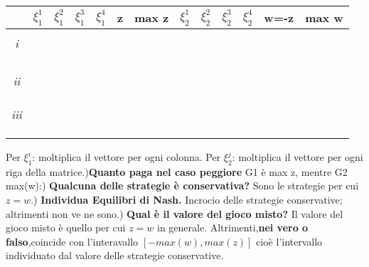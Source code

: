 \documentclass{article}
\theoremstyle{definition}
\theoremstyle{remark}
\begin{document}
\begin{center}
    \begin{tabular}{|c|c |c |c |c |c |c |c |c |c |c |c | c|}
     \hline
     &\(\xi _1^1\) & \(\xi_1^2\) & \(\xi_1^3\) & \(\xi_1^4\) & z & max z & \(\xi_2^1\) & \(\xi_2^2\) & \(\xi_2^3\) & \(\xi_2^4\) & w=-z & max w\\ [0.5ex] 
     \hline
      & & & & & & & & & & & &\\
      \hline
      \emph{i}& & & & & & & & & & & &\\
      \hline
       & & & & & & & & & & & &\\
      \hline
      & & & & & & & & & & & &\\
      \hline\hline
      & & & & & & & & & & & &\\
      \hline
      & & & & & & & & & & & &\\
       \hline
       \emph{ii}& & & & & & & & & & & &\\
       & & & & & & & & & & & &\\
      \hline
      & & & & & & & & & & & &\\
       \hline\hline
      & & & & & & & & & & & &\\
       \hline
       \emph{iii} & & & & & & & & & & & &\\
       & & & & & & & & & & & &\\
      \hline
      & & & & & & & & & & & &\\
       \hline
      & & & & & & & & & & & &\\
      \hline
    \end{tabular}
    \end{center}
Per \(\xi_1^i\): moltiplica il vettore per ogni colonna.\newline
Per \(\xi_2^j\): moltiplica il vettore per ogni riga della matrice.)\textbf{Quanto paga nel caso peggiore} G1 è max z, mentre G2 max(w):) \textbf{Qualcuna delle strategie è conservativa?} Sono le strategie per cui \(z=w\).) \textbf{ Individua Equilibri di Nash.} Incrocio delle strategie conservative; altrimenti non ve ne sono.) \textbf{Qual è il valore del gioco misto?} Il valore del gioco misto è quello per cui \(z=w\) in generale. Altrimenti,\textbf{nei vero o falso},coincide con l'interavallo \([-max(w),max(z)]\) cioè l'intervallo
individuato dal valore delle strategie conservative.\newline
\end{document}
